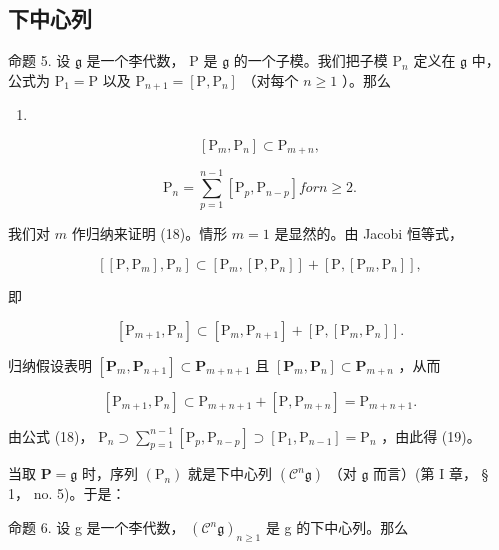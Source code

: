 \subsection{下中心列}

命题 5. 设 \(\mathfrak{g}\) 是一个李代数， \(\mathrm{P}\) 是 \(\mathfrak{g}\) 的一个子模。我们把子模 \(\mathrm{P}_n\) 定义在 \(\mathfrak{g}\) 中，公式为 \(\mathrm{P}_1 = \mathrm{P}\) 以及 \(\mathrm{P}_{n+1} = [\mathrm{P},\mathrm{P}_n]\) （对每个 \(n\geqslant 1\) ）。那么

\begin{enumerate}
\def\labelenumi{(\arabic{enumi})}
\setcounter{enumi}{17}
\tightlist
\item
\end{enumerate}

\[
[ \mathrm{P} _ {m}, \mathrm{P} _ {n} ] \subset \mathrm{P} _ {m + n},\tag{18}
\]

\[
\mathrm{P} _ {n} = \sum_ {p = 1} ^ {n - 1} \left[ \mathrm{P} _ {p}, \mathrm{P} _ {n - p} \right] for n \geqslant 2.\tag{19}
\]

我们对 \(m\) 作归纳来证明 (18)。情形 \(m = 1\) 是显然的。由 Jacobi 恒等式，

\[
[ [ \mathrm{P}, \mathrm{P} _ {m} ], \mathrm{P} _ {n} ] \subset [ \mathrm{P} _ {m}, [ \mathrm{P}, \mathrm{P} _ {n} ] ] + [ \mathrm{P}, [ \mathrm{P} _ {m}, \mathrm{P} _ {n} ] ],
\]

即

\[
[ \mathrm{P} _ {m + 1}, \mathrm{P} _ {n} ] \subset [ \mathrm{P} _ {m}, \mathrm{P} _ {n + 1} ] + [ \mathrm{P}, [ \mathrm{P} _ {m}, \mathrm{P} _ {n} ] ].
\]

归纳假设表明 \([\mathbf{P}_m, \mathbf{P}_{n+1}] \subset \mathbf{P}_{m+n+1}\) 且 \([\mathbf{P}_m, \mathbf{P}_n] \subset \mathbf{P}_{m+n}\) ，从而

\[
[ \mathrm{P} _ {m + 1}, \mathrm{P} _ {n} ] \subset \mathrm{P} _ {m + n + 1} + [ \mathrm{P}, \mathrm{P} _ {m + n} ] = \mathrm{P} _ {m + n + 1}.
\]

由公式 (18)， \(\mathrm{P}_n\supset \sum_{p = 1}^{n - 1}[\mathrm{P}_p,\mathrm{P}_{n - p}]\supset [\mathrm{P}_1,\mathrm{P}_{n - 1}] = \mathrm{P}_n\) ，由此得 (19)。

当取 \(\mathbf{P} = \mathfrak{g}\) 时，序列 \((\mathrm{P}_n)\) 就是下中心列 \((\mathcal{C}^n\mathfrak{g})\) （对 \(\mathfrak{g}\) 而言）(第 I 章， § 1， no. 5)。于是：

命题 6. 设 g 是一个李代数， \((\mathcal{C}^{n}\mathfrak{g})_{n\geqslant 1}\) 是 g 的下中心列。那么

